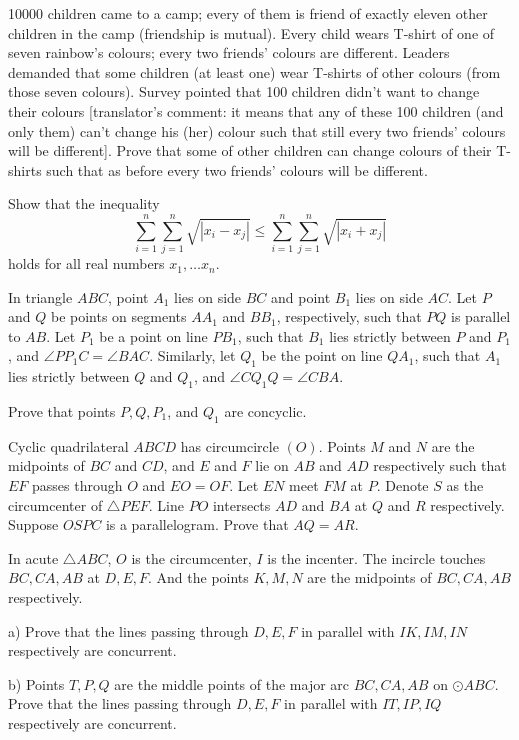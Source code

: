 \documentclass[11pt]{scrartcl}
\begin{document}
\begin{problem}[4527883777563937913]
10000 children came to a camp; every of them is friend of exactly eleven other children in the camp (friendship is mutual). Every child wears T-shirt of one of seven rainbow's colours; every two friends' colours are different. Leaders demanded that some children (at least one) wear T-shirts of other colours (from those seven colours). Survey pointed that 100 children didn't want to change their colours [translator's comment: it means that any of these 100 children (and only them) can't change his (her) colour such that still every two friends' colours will be different]. Prove that some of other children can change colours of their T-shirts such that as before every two friends' colours will be different.
\end{problem}
\begin{problem}[952584318797289]
Show that the inequality\[\sum_{i=1}^n \sum_{j=1}^n \sqrt{|x_i-x_j|}\leqslant \sum_{i=1}^n \sum_{j=1}^n \sqrt{|x_i+x_j|}\]holds for all real numbers $x_1,\ldots x_n.$
\end{problem}
\begin{problem}[684771433215596]
In triangle $ABC$, point $A_1$ lies on side $BC$ and point $B_1$ lies on side $AC$. Let $P$ and $Q$ be points on segments $AA_1$ and $BB_1$, respectively, such that $PQ$ is parallel to $AB$. Let $P_1$ be a point on line $PB_1$, such that $B_1$ lies strictly between $P$ and $P_1$, and $\angle PP_1C=\angle BAC$. Similarly, let $Q_1$ be the point on line $QA_1$, such that $A_1$ lies strictly between $Q$ and $Q_1$, and $\angle CQ_1Q=\angle CBA$.

Prove that points $P,Q,P_1$, and $Q_1$ are concyclic.
\end{problem}
\begin{problem}[6612845742708555351]
	Cyclic quadrilateral $ABCD$ has circumcircle $(O)$. Points $M$ and $N$ are the midpoints of $BC$ and $CD$, and $E$ and $F$ lie on $AB$ and $AD$ respectively such that $EF$ passes through $O$ and $EO=OF$. Let $EN$ meet $FM$ at $P$. Denote $S$ as the circumcenter of $\triangle PEF$. Line $PO$ intersects $AD$ and $BA$ at $Q$ and $R$ respectively. Suppose $OSPC$ is a parallelogram. Prove that $AQ=AR$.
\end{problem}
\begin{problem}[423911944927735]
In acute $\triangle ABC$, $O$ is the circumcenter, $I$ is the incenter. The incircle touches $BC,CA,AB$ at $D,E,F$. And the points $K,M,N$ are the midpoints of $BC,CA,AB$ respectively.

a) Prove that the lines passing through $D,E,F$ in parallel with $IK,IM,IN$ respectively are concurrent.

b) Points $T,P,Q$ are the middle points of the major arc $BC,CA,AB$ on $\odot ABC$. Prove that the lines passing through $D,E,F$ in parallel with $IT,IP,IQ$ respectively are concurrent.
\end{problem}
\end{document}
